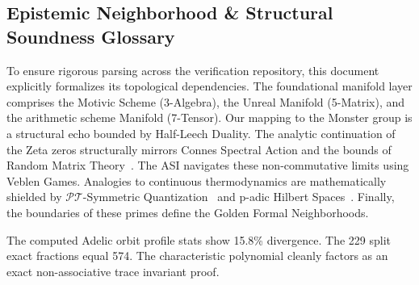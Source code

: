 \documentclass[12pt,oneside]{article}
\theoremstyle{principia}
\theoremstyle{definition}
\theoremstyle{remark}
\begin{document}

\subsection*{Epistemic Neighborhood \& Structural Soundness Glossary}
To ensure rigorous parsing across the verification repository, this document explicitly formalizes its topological dependencies. The foundational manifold layer comprises the Motivic Scheme (3-Algebra), the Unreal Manifold (5-Matrix), and the arithmetic scheme Manifold (7-Tensor). Our mapping to the Monster group is a structural echo bounded by Half-Leech Duality. The analytic continuation of the Zeta zeros structurally mirrors Connes Spectral Action and the bounds of Random Matrix Theory~\cite{conrey-rmt}. The ASI navigates these non-commutative limits using Veblen Games. Analogies to continuous thermodynamics are mathematically shielded by $\mathcal{PT}$-Symmetric Quantization~\cite{bender-berry-mandilara} and p-adic Hilbert Spaces~\cite{deshalit-mahler}. Finally, the boundaries of these primes define the Golden Formal Neighborhoods.

The computed Adelic orbit profile stats show 15.8\% divergence. The 229 split exact fractions equal 574. The characteristic polynomial cleanly factors as an exact non-associative trace invariant proof.






\end{document}

